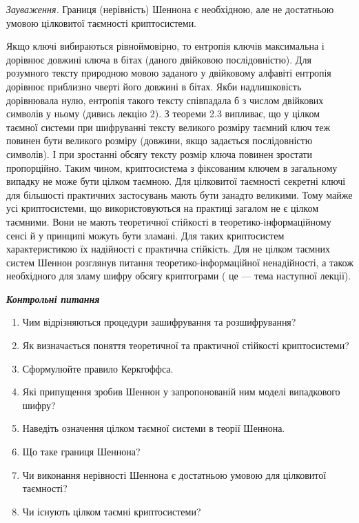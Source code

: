 \textit{Зауваження.} Границя (нерівність) Шеннона є необхідною, але не
достатньою умовою цілковитої таємності криптосистеми.

Якщо ключі вибираються рівноймовірно, то ентропія ключів максимальна і дорівнює
довжині ключа в бітах (даного двійковою послідовністю). Для розумного тексту
природною мовою заданого у двійковому алфавіті ентропія дорівнює приблизно
чверті його довжині в бітах. Якби надлишковість дорівнювала нулю, ентропія
такого тексту співпадала б з числом двійкових символів у ньому (дивись лекцію
2). З теореми 2.3 випливає, що у цілком таємної системи при шифруванні тексту
великого розміру таємний ключ теж повинен бути великого розміру (довжини, якщо
задається послідовністю символів). І при зростанні обсягу тексту розмір ключа
повинен зростати пропорційно. Таким чином, криптосистема з фіксованим ключем в
загальному випадку не може бути цілком таємною. Для цілковитої таємності
секретні ключі для більшості практичних застосувань мають бути занадто
великими. Тому майже усі криптосистеми, що використовуються на практиці загалом
не є цілком таємними. Вони не мають теоретичної стійкості в
теоретико-інформаційному сенсі й  у принципі можуть бути зламані. Для таких
криптосистем характеристикою їх надійності є практична стійкість. Для не цілком
таємних систем Шеннон розглянув питання теоретико-інформаційної ненадійності, а
також необхідного для зламу шифру обсягу криптограми ( це --- тема наступної
лекції).


\bigskip

{\centering\bfseries\itshape
Контрольні питання
\par}


\bigskip


\bigskip

\liststyleWWviiiNumxlv
\begin{enumerate}
\item Чим відрізняються процедури зашифрування та розшифрування?
\item Як визначається поняття теоретичної та практичної стійкості криптосистеми?
\item Сформулюйте правило Керкгоффса.
\item Які припущення зробив Шеннон у запропонованій ним моделі випадкового
шифру?
\item Наведіть означення цілком таємної системи в теорії Шеннона.
\item Що таке границя Шеннона?
\item Чи виконання нерівності Шеннона є достатньою умовою для цілковитої
таємності?
\item Чи існують цілком таємні криптосистеми? 
\end{enumerate}

